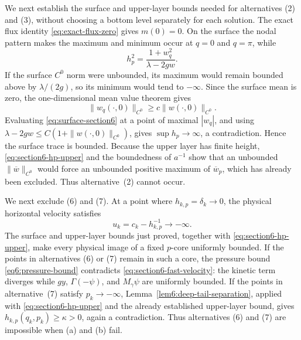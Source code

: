 \documentclass[11pt,reqno]{amsart}
\numberwithin{equation}{section}
\theoremstyle{definition}
\theoremstyle{remark}
\begin{document}
We next establish the surface and upper-layer bounds needed for
alternatives \textup{(2)} and \textup{(3)}, without choosing a bottom
level separately for each solution.  The
exact flux identity \eqref{eq:exact-flux-zero} gives $m(0)=0$.
On the surface the nodal pattern makes the maximum and minimum occur
at $q=0$ and $q=\pi$, while
\begin{equation}\label{eq:surface-section6}
 h_p^2=\frac{1+w_q^2}{\lambda-2gw}.
\end{equation}
If the surface $C^0$ norm were unbounded, its maximum would remain
bounded above by $\lambda/(2g)$, so its minimum would tend to
$-\infty$.  Since the surface mean is zero, the one-dimensional mean
value theorem gives
\[
 \|w_q(\cdot,0)\|_{C^0}\ge c\|w(\cdot,0)\|_{C^0}.
\]
Evaluating \eqref{eq:surface-section6} at a point of maximal
$|w_q|$, and using
$\lambda-2gw\le C(1+\|w(\cdot,0)\|_{C^0})$, gives
$\sup h_p\to\infty$, a contradiction.  Hence the
surface trace is bounded.  Because the upper layer has finite height,
\eqref{eq:section6-hp-upper} and the boundedness of $a^{-1}$ show
that an unbounded $\|\overline w\|_{C^0}$ would force an unbounded
positive maximum of $\overline w_p$, which has already been excluded.
Thus alternative~\textup{(2)} cannot occur.

We next exclude \textup{(6)} and \textup{(7)}.  At a point
where $h_{k,p}=\delta_k\to0$, the physical horizontal velocity
satisfies
\begin{equation}\label{eq:section6-fast-velocity}
 u_k=c_k-h_{k,p}^{-1}\longrightarrow-\infty.
\end{equation}
The surface and upper-layer bounds just proved, together with
\eqref{eq:section6-hp-upper}, make every physical image of a fixed
$p$-core uniformly bounded.  If the points in alternatives
\textup{(6)} or \textup{(7)} remain in such a core, the pressure bound \eqref{eq6:pressure-bound} contradicts
\eqref{eq:section6-fast-velocity}: the kinetic term diverges while
$gy$, $\Gamma(-\psi)$, and $M_\gamma\psi$ are uniformly bounded.
If the points in alternative~\textup{(7)} satisfy $p_k\to-\infty$,
Lemma~\ref{lem6:deep-tail-separation}, applied with
\eqref{eq:section6-hp-upper} and the already established upper-layer
bound, gives $h_{k,p}(q_k,p_k)\ge\kappa>0$, again a contradiction.
Thus alternatives \textup{(6)} and \textup{(7)} are impossible
when \textup{(a)} and \textup{(b)} fail.
\end{document}
